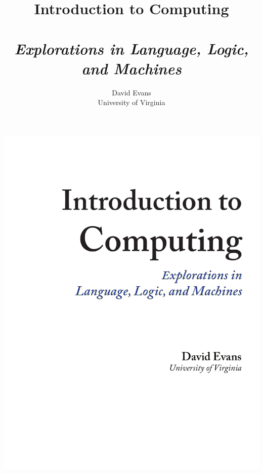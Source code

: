 \documentclass[10pt]{book}
\begin{document}




\frontmatter

\thispagestyle{empty}

\title{Introduction to Computing\\\ \\
       \sl \large{Explorations in Language, Logic, and Machines}}

\author{David Evans \\ University of Virginia}


\begin{titlepage}

\includegraphics[width=6.44in]{cover/innercover.pdf}

%
%


\end{titlepage}
\end{document}

